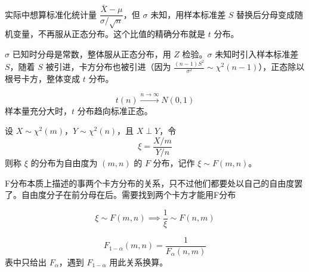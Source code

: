 \begin{note}[为什么要构造 $t$ 分布]
实际中想算标准化统计量 $\dfrac{\bar{X}-\mu}{\sigma/\sqrt{n}}$，但 $\sigma$ 未知，用样本标准差 $S$ 替换后分母变成随机变量，不再服从正态分布。这个比值的精确分布就是 $t$ 分布。
\end{note}
\begin{dxtips}
$\sigma$ 已知时分母是常数，整体服从正态分布，用 $Z$ 检验。$\sigma$ 未知时引入样本标准差 $S$，随着 $S$ 被引进，卡方分布也被引进（因为 $\frac{(n-1)S^2}{\sigma^2}\sim\chi^2(n-1)$），正态除以根号卡方，整体变成 $t$ 分布。
\end{dxtips}
\begin{note}[渐近性质]
$$t(n) \xrightarrow{n \to \infty} N(0,1)$$
样本量充分大时，$t$ 分布趋向标准正态。
\end{note}
\begin{definition}[$F$ 分布]
设 $X \sim \chi^2(m)$，$Y \sim \chi^2(n)$，且 $X \perp Y$，令
$$\xi = \frac{X/m}{Y/n}$$
则称 $\xi$ 的分布为自由度为 $(m,n)$ 的 $F$ 分布，记作 $\xi \sim F(m,n)$。
\end{definition}
\begin{dxtips}
    F分布本质上描述的事两个卡方分布的关系，只不过他们都要处以自己的自由度罢了。自由度分子在前分母在后。需要找到两个卡方才能用F分布
\end{dxtips}
\begin{note}[倒数性质]
$$\xi \sim F(m,n) \implies \frac{1}{\xi} \sim F(n,m)$$
\end{note}

\begin{note}[分位数关系]
$$F_{1-\alpha}(m,n) = \frac{1}{F_{\alpha}(n,m)}$$
表中只给出 $F_\alpha$，遇到 $F_{1-\alpha}$ 用此关系换算。
\end{note}

